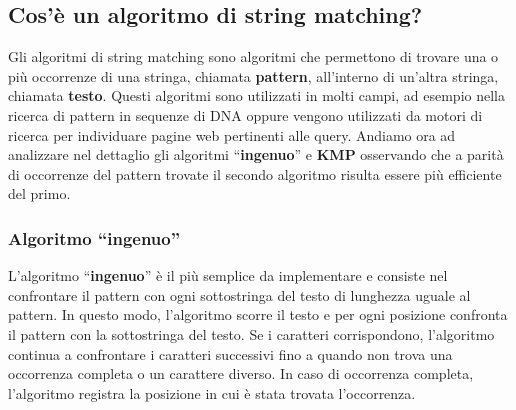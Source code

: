 \documentclass{article}
\begin{document}
\subsection{Cos'è un algoritmo di string matching?}
Gli algoritmi di string matching sono algoritmi che permettono di trovare una o più occorrenze di una stringa, chiamata \textbf{pattern}, all'interno di un'altra stringa, chiamata \textbf{testo}. Questi algoritmi sono utilizzati in molti campi, ad esempio nella ricerca di pattern in sequenze di DNA oppure vengono utilizzati da motori di ricerca per individuare pagine web pertinenti alle query.
Andiamo ora ad analizzare nel dettaglio gli algoritmi ``\textbf{ingenuo}'' e \textbf{KMP} osservando che a parità di occorrenze del pattern trovate il secondo algoritmo risulta essere più efficiente del primo.

\subsubsection{Algoritmo ``ingenuo''}
L'algoritmo ``\textbf{ingenuo}'' è il più semplice da implementare e consiste nel confrontare il pattern con ogni sottostringa del testo di lunghezza uguale al pattern. In questo modo, l'algoritmo scorre il testo e per ogni posizione confronta il pattern con la sottostringa del testo. Se i caratteri corrispondono, l'algoritmo continua a confrontare i caratteri successivi fino a quando non trova una occorrenza completa o un carattere diverso. In caso di occorrenza completa, l'algoritmo registra la posizione in cui è stata trovata l'occorrenza.
\end{document}
